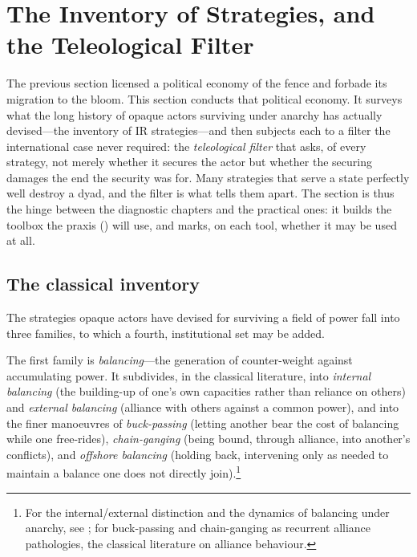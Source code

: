 \section{The Inventory of Strategies, and the Teleological Filter}
\label{p17:sec:practices}

\noindent
The previous section licensed a political economy of the fence and forbade its migration to the bloom. This section conducts that political economy. It surveys what the long history of opaque actors surviving under anarchy has actually devised---the inventory of IR strategies---and then subjects each to a filter the international case never required: the \emph{teleological filter} that asks, of every strategy, not merely whether it secures the actor but whether the securing damages the end the security was for. Many strategies that serve a state perfectly well destroy a dyad, and the filter is what tells them apart. The section is thus the hinge between the diagnostic chapters and the practical ones: it builds the toolbox the praxis () will use, and marks, on each tool, whether it may be used at all.

\subsection{The classical inventory}
\label{p17:sub:practices-inventory}

The strategies opaque actors have devised for surviving a field of power fall into three families, to which a fourth, institutional set may be added.

The first family is \emph{balancing}---the generation of counter-weight against accumulating power. It subdivides, in the classical literature, into \emph{internal balancing} (the building-up of one's own capacities rather than reliance on others) and \emph{external balancing} (alliance with others against a common power), and into the finer manoeuvres of \emph{buck-passing} (letting another bear the cost of balancing while one free-rides), \emph{chain-ganging} (being bound, through alliance, into another's conflicts), and \emph{offshore balancing} (holding back, intervening only as needed to maintain a balance one does not directly join).\footnote{For the internal/external distinction and the dynamics of balancing under anarchy, see \textcite{waltz1979}; for buck-passing and chain-ganging as recurrent alliance pathologies, the classical literature on alliance behaviour.}

